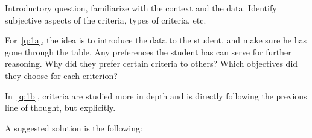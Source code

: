 \documentclass[10pt, UKenglish]{exam}
\begin{document}
\begin{questions}
	\question
	

	\begin{comments}
		Introductory question, familiarize with the context
		and the data. Identify subjective aspects of the criteria,
		types of criteria, etc.

		For~\cref{q:1a}, the idea is to introduce the data to the 
		student, and make sure he has gone through the table. Any preferences
		the student has can serve for further reasoning. Why did they prefer
		certain criteria to others? Which objectives did they choose for each
		criterion?

		In~\cref{q:1b}, criteria are studied more in depth and is directly
		following the previous line of thought, but explicitly.
	\end{comments}
	
	\begin{solutionorbox}

		A suggested solution is the following:


\end{solutionorbox}
\end{questions}
\end{document}
